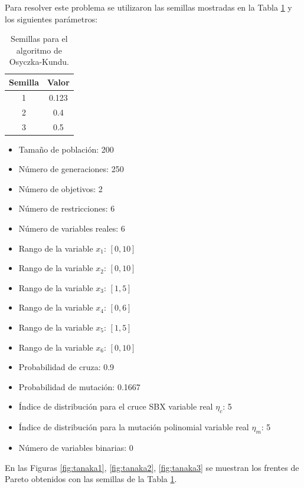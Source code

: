 \documentclass[conference]{IEEEtran}
\begin{document}
Para resolver este problema se utilizaron las semillas mostradas en la Tabla \ref{tab:osy} y los siguientes parámetros:

\begin{table}[h!]   
	\caption{Semillas para el algoritmo de Osyczka-Kundu.}                                                                                                                
		\centering                                       
		\begin{tabular}{cc}
			\hline                                             
			Semilla & Valor \\                     
			\hline 
			1 & 0.123\\                                            
			2 & 0.4\\
			3 & 0.5\\
			\hline                                             
		\end{tabular}
		\label{tab:osy}
	\end{table}

\begin{itemize}
\item Tamaño de población: 200
\item Número de generaciones: 250
\item Número de objetivos: 2
\item Número de restricciones: 6
\item Número de variables reales: 6
\item Rango de la variable $x_{1}$: $[ 0, 10]$
\item Rango de la variable $x_{2}$:  $[ 0, 10]$
\item Rango de la variable $x_{3}$: $[ 1, 5]$
\item Rango de la variable $x_{4}$:  $[ 0, 6]$
\item Rango de la variable $x_{5}$: $[ 1, 5]$
\item Rango de la variable $x_{6}$:  $[ 0, 10]$
\item Probabilidad de cruza: 0.9
\item Probabilidad de mutación: 0.1667
\item Índice de distribución para el cruce SBX variable real $\eta_{c}$: 5
\item Índice de distribución para la mutación polinomial variable real $\eta_{m}$: 5
\item Número de variables binarias: 0
\end{itemize}


En las Figuras \ref{fig:tanaka1}, \ref{fig:tanaka2}, \ref{fig:tanaka3} se muestran los frentes de Pareto obtenidos con las semillas de la Tabla \ref{tab:osy}.	
	
\end{document}
